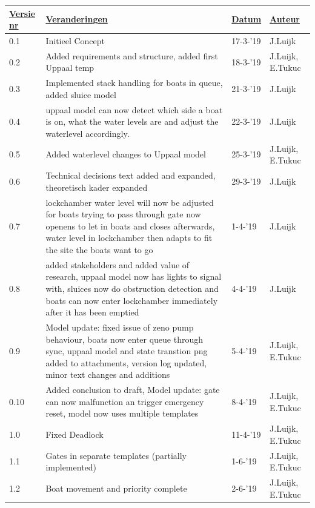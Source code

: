 \documentclass{article}
\begin{document}
\begin{table}[htp]
\begin{tabular}{|l|p{2.5in}|l|l|}
\hline
\rowcolor[HTML]{FFD700} 
{\ul \textbf{Versie nr}} & {\ul \textbf{Veranderingen}} & {\ul \textbf{Datum}} & {\ul \textbf{Auteur}} \\
\hline
0.1 & Initieel Concept & 17-3-'19 & J.Luijk \\    
\hline
0.2 &  Added requirements and structure, added first Uppaal temp & 18-3-'19 & J.Luijk, E.Tukuc \\ 
\hline
0.3 &  Implemented stack handling for boats in queue, added sluice model& 21-3-'19 & J.Luijk\\ 
\hline
0.4 & uppaal model can now detect which side a boat is on, what the water levels are and adjust the waterlevel accordingly. & 22-3-'19 & J.Luijk\\ 
\hline
0.5 & Added waterlevel changes to Uppaal model & 25-3-'19 & J.Luijk, E.Tukuc\\ 
\hline
0.6 & Technical decisions text added and expanded, theoretisch kader expanded  & 29-3-'19 &  J.Luijk\\ 
\hline
0.7 & lockchamber water level will now be adjusted for boats trying to pass through gate now openens to let in boats and closes afterwards, water level in lockchamber then adapts to fit the site the boats want to go & 1-4-'19 & J.Luijk  \\ 
\hline
0.8 & added stakeholders and added value of research, uppaal model now has lights to signal with, sluices now do obstruction detection and boats can now enter lockchamber immediately after it has been emptied& 4-4-'19 & J.Luijk \\ 
\hline
0.9 & Model update: fixed issue of zeno pump behaviour, boats now enter queue through sync, uppaal model and state transtion png added to attachments, version log updated, minor text changes and additions & 5-4-'19 & J.Luijk, E.Tukuc \\ 
\hline
0.10 & Added conclusion to draft, Model update: gate can now malfunction an trigger emergency reset, model now uses multiple templates & 8-4-'19 & J.Luijk, E.Tukuc \\ 
\hline
1.0 & Fixed Deadlock & 11-4-'19 & J.Luijk, E.Tukuc \\ 
\hline
1.1 & Gates in separate templates (partially implemented) & 1-6-'19 & J.Luijk, E.Tukuc \\ 
\hline
1.2 & Boat movement and priority complete & 2-6-'19 & J.Luijk, E.Tukuc \\ 

\end{tabular}
\end{table}
\end{document}
